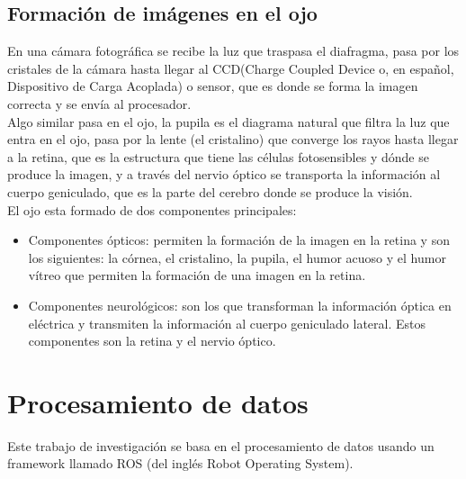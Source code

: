 \subsection{Formación de imágenes en el ojo}
En una cámara fotográfica se recibe la luz que traspasa el diafragma, pasa por los 
cristales de la cámara hasta llegar al CCD(Charge Coupled Device o, en español, 
Dispositivo de Carga Acoplada) o sensor, que es donde se forma la imagen correcta y se 
envía al procesador.\\
Algo similar pasa en el ojo, la pupila es el diagrama natural que filtra la luz que 
entra en el ojo, pasa por la lente (el cristalino)  que converge los rayos hasta 
llegar a la retina, que es la estructura que tiene las células fotosensibles y dónde 
se produce la imagen, y a través del nervio óptico se transporta la información al 
cuerpo geniculado, que es la parte del cerebro donde se produce la visión.\\
El ojo esta formado de dos componentes principales:
\begin{itemize}
\item Componentes ópticos: permiten la formación de la imagen en la retina y son los 
siguientes: la córnea, el cristalino, la pupila, el humor acuoso y el humor vítreo que 
permiten la formación de una imagen en la retina.
\item Componentes neurológicos: son los que transforman la información óptica en 
eléctrica y transmiten la información al cuerpo geniculado lateral. Estos componentes 
son la retina y el nervio óptico.
\end{itemize}

\section{Procesamiento de datos}
Este trabajo de investigación se basa en el procesamiento de datos usando un framework
llamado ROS (del inglés Robot Operating System).
